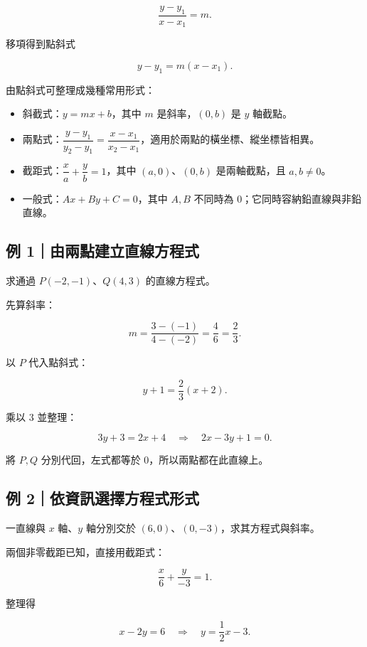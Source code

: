 \documentclass[11pt,a4paper]{article}
\providecommand{\tightlist}{%
  \setlength{\itemsep}{0pt}\setlength{\parskip}{0pt}}
\begin{document}
\[
\frac{y-y_1}{x-x_1}=m.
\]

移項得到點斜式

\[
\boxed{y-y_1=m(x-x_1)}.
\]

由點斜式可整理成幾種常用形式：

\begin{itemize}
\tightlist
\item
  斜截式：\(y=mx+b\)，其中 \(m\) 是斜率，\((0,b)\) 是 \(y\) 軸截點。
\item
  兩點式：\(\dfrac{y-y_1}{y_2-y_1}=\dfrac{x-x_1}{x_2-x_1}\)，適用於兩點的橫坐標、縱坐標皆相異。
\item
  截距式：\(\dfrac{x}{a}+\dfrac{y}{b}=1\)，其中 \((a,0)\)、\((0,b)\) 是兩軸截點，且 \(a,b\ne0\)。
\item
  一般式：\(Ax+By+C=0\)，其中 \(A,B\) 不同時為 \(0\)；它同時容納鉛直線與非鉛直線。
\end{itemize}

\subsection{例 1｜由兩點建立直線方程式}\label{ux4f8b-1ux7531ux5169ux9edeux5efaux7acbux76f4ux7ddaux65b9ux7a0bux5f0f}

求通過 \(P(-2,-1)\)、\(Q(4,3)\) 的直線方程式。

先算斜率：

\[
m=\frac{3-(-1)}{4-(-2)}=\frac46=\frac23.
\]

以 \(P\) 代入點斜式：

\[
y+1=\frac23(x+2).
\]

乘以 \(3\) 並整理：

\[
3y+3=2x+4
\quad\Longrightarrow\quad
\boxed{2x-3y+1=0}.
\]

將 \(P,Q\) 分別代回，左式都等於 \(0\)，所以兩點都在此直線上。

\subsection{例 2｜依資訊選擇方程式形式}\label{ux4f8b-2ux4f9dux8cc7ux8a0aux9078ux64c7ux65b9ux7a0bux5f0fux5f62ux5f0f}

一直線與 \(x\) 軸、\(y\) 軸分別交於 \((6,0)\)、\((0,-3)\)，求其方程式與斜率。

兩個非零截距已知，直接用截距式：

\[
\frac{x}{6}+\frac{y}{-3}=1.
\]

整理得

\[
x-2y=6
\quad\Longrightarrow\quad
y=\frac12x-3.
\]
\end{document}

